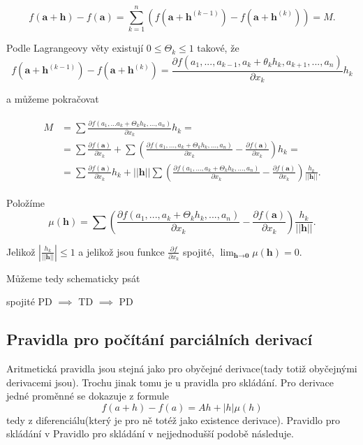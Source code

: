 \documentclass[10pt]{article}
\begin{document}
\[f(\textbf{a}+\textbf{h}) - f(\textbf{a}) = \sum^n_{k=1}(f(\textbf{a}+\textbf{h}^{(k-1)})-f(\textbf{a}+\textbf{h}^{(k)})) = M.\]

Podle Lagrangeovy věty existují $0 \leq \Theta_k \leq 1$ takové, že
\[f(\textbf{a}+\textbf{h}^{(k-1)})-f(\textbf{a}+\textbf{h}^{(k)}) = \frac{\partial f(a_1,...,a_{k-1},a_k+ \theta_kh_k,a_{k+1},...,a_n)}{\partial x_k}h_k\]

a můžeme pokračovat

\begin{align*} 
\begin{split}
M & = \sum\frac{\partial f(a_1,...a_k+\Theta_kh_k,...,a_n)}{\partial x_k}h_k = \\
 & = \sum \frac{\partial f(\textbf{a})}{\partial x_k} + \sum \left( \frac{\partial f(a_1,...,a_k+\Theta_kh_k,...,a_n)}{\partial x_k}
 - \frac{\partial f(\textbf{a})}{\partial x_k} \right)h_k = \\
 & = \sum \frac{\partial f(\textbf{a})}{\partial x_k}h_k + ||\textbf{h}||\sum\left(\frac{\partial f(a_1,...,a_k+\Theta_kh_k,...,a_n)}
 {\partial x_k}- \frac{\partial f(\textbf{a})}{\partial x_k}\right)\frac{h_k}{||\textbf{h}||}.
\end{split}
\end{align*}

Položíme
\[\mu (\textbf{h}) = \sum\left(\frac{\partial f(a_1,...,a_k+\Theta_kh_k,...,a_n)}{\partial x_k} -
    \frac{\partial f(\textbf{a})}{\partial x_k} \right)\frac{h_k}{||\textbf{h}||}.\]
    
    Jelikož $\left|\frac{h_k}{||\textbf{h}||}\right| \leq 1$ a jelikož jsou funkce $\frac{\partial f}{\partial x_k}$ spojité,
    $\lim_{\textbf{h}\rightarrow \textbf{0}} \mu (\textbf{h}) = 0$.
    \begin{center}
    \LARGE 
    Můžeme tedy schematicky psát
    
    \LARGE 
    spojité PD $\implies$ TD $\implies$ PD
    \end{center}
\noindent

\subsection{Pravidla pro počítání parciálních derivací}
\hspace{1.2mm}
\noindent
Aritmetická pravidla jsou stejná jako pro obyčejné derivace(tady totiž obyčejnými derivacemi jsou).
Trochu jinak tomu je u pravidla pro skládání. Pro derivace jedné proměnné se dokazuje z formule
\[ f(a+h) - f(a) = Ah + |h|\mu (h) \]
tedy z diferenciálu(který je pro ně totéž jako existence derivace). Pravidlo pro skládání v
Pravidlo pro skládání v nejjednodušší podobě následuje.
\end{document}
